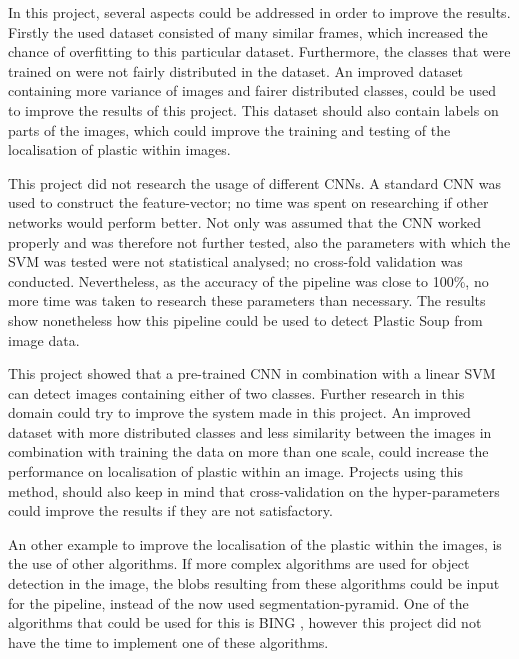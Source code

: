 In this project, several aspects could be addressed in order to improve the results.
Firstly the used dataset consisted of many similar frames, which increased the chance of overfitting to this particular dataset.
Furthermore, the classes that were trained on were not fairly distributed in the dataset.
An improved dataset containing more variance of images and fairer distributed classes, could be used to improve the results of this project.
This dataset should also contain labels on parts of the images, which could improve the training and testing of the localisation of plastic within images.

This project did not research the usage of different CNNs.
A standard CNN was used to construct the feature-vector; no time was spent on researching if other networks would perform better.
Not only was assumed that the CNN worked properly and was therefore not further tested, also the parameters with which the SVM was tested were not statistical analysed; no cross-fold validation was conducted.
Nevertheless, as the accuracy of the pipeline was close to 100\%, no more time was taken to research these parameters than necessary.
The results show nonetheless how this pipeline could be used to detect Plastic Soup from image data.

This project showed that a pre-trained CNN in combination with a linear SVM can detect images containing either of two classes.
Further research in this domain could try to improve the system made in this project.
An improved dataset with more distributed classes and less similarity between the images in combination with training the data on more than one scale, could increase the performance on localisation of plastic within an image.
Projects using this method, should also keep in mind that cross-validation on the hyper-parameters could improve the results if they are not satisfactory.

An other example to improve the localisation of the plastic within the images, is the use of other algorithms.
If more complex algorithms are used for object detection in the image, the blobs resulting from these algorithms could be input for the pipeline, instead of the now used segmentation-pyramid.
One of the algorithms that could be used for this is BING \citep{BingObj2014}, however this project did not have the time to implement one of these algorithms.

